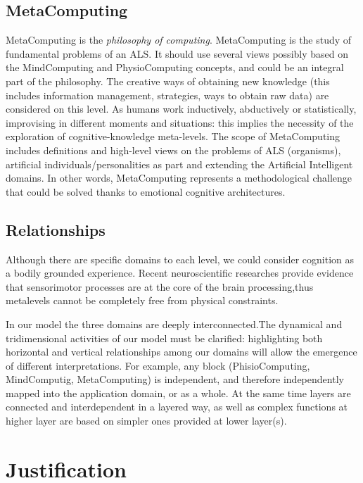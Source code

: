 \subsection{MetaComputing}\label{metacomputing}

MetaComputing is the \emph{philosophy of computing}. MetaComputing is
the study of fundamental problems of an ALS. It should use several views
possibly based on the MindComputing and PhysioComputing concepts, and
could be an integral part of the philosophy. The creative ways of
obtaining new knowledge (this includes information management,
strategies, ways to obtain raw data) are considered on this level. As
humans work inductively, abductively or statistically, improvising in
different moments and situations: this implies the necessity of the
exploration of cognitive-knowledge meta-levels. The scope of
MetaComputing includes definitions and high-level views on the problems
of ALS (organisms), artificial individuals/personalities as part and
extending the Artificial Intelligent domains. In other words,
MetaComputing represents a methodological challenge that could be solved
thanks to emotional cognitive architectures.

\subsection{Relationships}\label{relationships}

Although there are specific domains to each level, we could consider
cognition as a bodily grounded experience. Recent neuroscientific
researches provide evidence that sensorimotor processes are at the core
of the brain processing,thus metalevels cannot be completely free from
physical constraints.

In our model the three domains are deeply interconnected.The dynamical
and tridimensional activities of our model must be clarified:
highlighting both horizontal and vertical relationships among our
domains will allow the emergence of different interpretations. For
example, any block (PhisioComputing, MindComputig, MetaComputing) is
independent, and therefore independently mapped into the application
domain, or as a whole. At the same time layers are connected and
interdependent in a layered way, as well as complex functions at higher
layer are based on simpler ones provided at lower layer(s).

\section{Justification}\label{justification}


